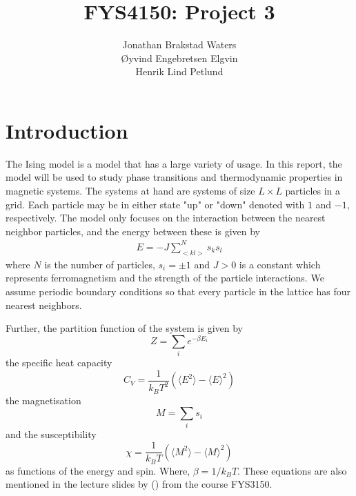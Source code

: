 \documentclass[12pt,english,a4paper]{article}
\title{FYS4150: Project 3}
\author{Jonathan Brakstad Waters\\Øyvind Engebretsen Elgvin\\Henrik Lind Petlund}
\begin{document}
\begin{titlepage}
\maketitle
\begin{abstract}
    
\end{abstract}

\end{titlepage}

\section{Introduction}

The Ising model is a model that has a large variety of usage. In this report, the model will be used to study phase transitions and thermodynamic properties in magnetic systems. The systems at hand are systems of size $L\times L$ particles in a grid. Each particle may be in either state "up" or "down" denoted with $1$ and $-1$, respectively. The model only focuses on the interaction between the nearest neighbor particles, and the energy between these is given by
\begin{align}
    E = -J \sum_{<kl>}^N s_ks_l 
\end{align}
where $N$ is the number of particles, $s_i=\pm 1$ and $J>0$ is a constant which represents ferromagnetism and the strength of the particle interactions. We assume periodic boundary conditions so that every particle in the lattice has four nearest neighbors. 

Further, the partition function of the system is given by
\begin{equation}
Z=\sum_i e^{-\beta E_i} \label{eq:partition}
\end{equation}
the specific heat capacity
\begin{equation}
C_V=\frac{1}{k_B T^2}\left(\langle E^2\rangle-\langle E\rangle^2\right)
\end{equation}
the magnetisation
\begin{equation}
M=\sum_is_i
\end{equation}
and the susceptibility
\begin{equation}
\chi= \frac{1}{k_B T}\left(\langle M^2\rangle-\langle M\rangle^2\right)
\end{equation}
as functions of the energy and spin. Where, $\beta =1/k_B T$. These equations are also mentioned in the lecture slides by (\cite{LectureIsing}) from the course FYS3150.
\end{document}

